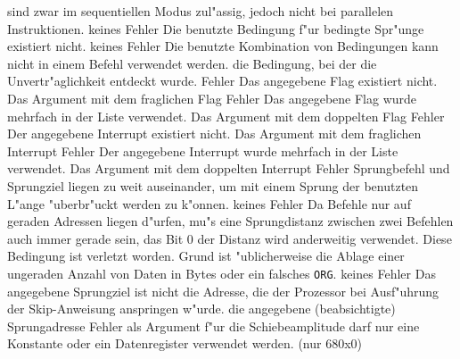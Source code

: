 \documentclass[12pt,a4paper,twoside]{report}
\newcommand{\tty}[1]{{\tt #1}}
\begin{document}
\begin{description}
{                sind zwar im sequentiellen Modus zul"assig, jedoch nicht
                bei parallelen Instruktionen.}
               {keines}
               {Fehler}
               {Die benutzte Bedingung f"ur bedingte Spr"unge
                existiert nicht.}
               {keines}
               {Fehler}
               {Die benutzte Kombination von Bedingungen kann nicht
                in einem Befehl verwendet werden.}
               {die Bedingung, bei der die Unvertr"aglichkeit
                entdeckt wurde.}
               {Fehler}
               {Das angegebene Flag existiert nicht.}
               {Das Argument mit dem fraglichen Flag}
               {Fehler}
               {Das angegebene Flag wurde mehrfach in der Liste verwendet.}
               {Das Argument mit dem doppelten Flag}
               {Fehler}
               {Der angegebene Interrupt existiert nicht.}
               {Das Argument mit dem fraglichen Interrupt}
               {Fehler}
               {Der angegebene Interrupt wurde mehrfach in der Liste verwendet.}
               {Das Argument mit dem doppelten Interrupt}
               {Fehler}
               {Sprungbefehl und Sprungziel liegen zu weit
                auseinander, um mit einem Sprung der benutzten L"ange
                "uberbr"uckt werden zu k"onnen.}
               {keines}
               {Fehler}
               {Da Befehle nur auf geraden Adressen liegen
                d"urfen, mu"s eine Sprungdistanz zwischen zwei Befehlen
                auch immer gerade sein, das Bit 0 der Distanz wird
                anderweitig verwendet.  Diese Bedingung ist verletzt
                worden.  Grund ist "ublicherweise die Ablage einer
                ungeraden Anzahl von Daten in Bytes oder ein falsches \tty{ORG}.}
               {keines}
               {Fehler}
               {Das angegebene Sprungziel ist nicht die Adresse, die der
                Prozessor bei Ausf"uhrung der Skip-Anweisung anspringen w"urde.}
               {die angegebene (beabsichtigte) Sprungadresse}
               {Fehler}
               {als Argument f"ur die Schiebeamplitude darf nur
                eine Konstante oder ein Datenregister verwendet werden.
                (nur 680x0)}

\end{description}
\end{document}
